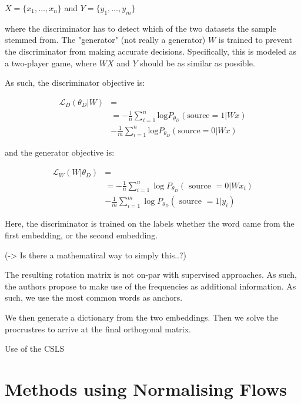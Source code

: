 \documentclass[a4paper,12pt,twoside,openright]{report}
\begin{document}
$ X = \{ x_1, \dots, x_n \} $ and $ Y = \{ y_1, \dots, y_m \} $

where the discriminator has to detect which of the two datasets the sample stemmed from.
The "generator" (not really a generator) $W$ is trained to prevent the discriminator from making accurate decisions.
Specifically, this is modeled as a two-player game, where $WX$ and $Y$ should be as similar as possible.

As such, the discriminator objective is: 

\begin{align}
\mathcal{L}_D(\theta_D | W) &= \\ 
&= -\frac{1}{n} \sum_{i=1}^n \text{log} P_{\theta_D}  (\text{source} = 1 | W x ) \\ &-  \frac{1}{m} \sum_{i=1}^n \text{log} P_{\theta_D}  (\text{source} = 0 | W x )
\end{align}

and the generator objective is:

\begin{align}
\mathcal{L}_W(W|\theta_D) &= \\
&= -\frac{1}{n} \sum_{i=1}^{n} \log P_{\theta_{D}}\left(\text { source }=0 | W x_{i}\right) \\ 
&-  \frac{1}{m} \sum_{i=1}^{m} \log P_{\theta_{D}}\left(\text { source }=1 | y_{i}\right)
\end{align}

Here, the discriminator is trained on the labels whether the word came from the first embedding, or the second embedding.

(-> Is there a mathematical way to simply this..?)

The resulting rotation matrix is not on-par with supervised approaches.
As such, the authors propose to make use of the frequencies as additional information.
As such, we use the most common words as anchors.

We then generate a dictionary from the two embeddings.
Then we solve the procrustres to arrive at the final orthogonal matrix.

Use of the CSLS









\section{Methods using Normalising Flows}
\end{document}

